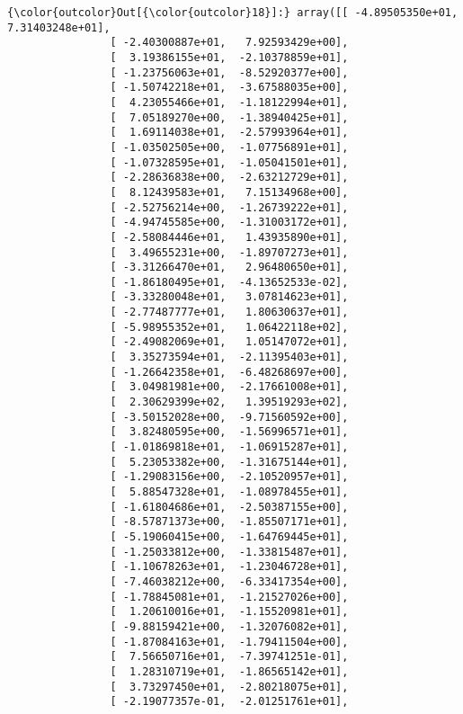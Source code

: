 \documentclass[11pt]{article}
\begin{document}
\begin{Verbatim}[commandchars=\\\{\}]
{\color{outcolor}Out[{\color{outcolor}18}]:} array([[ -4.89505350e+01,   7.31403248e+01],
                [ -2.40300887e+01,   7.92593429e+00],
                [  3.19386155e+01,  -2.10378859e+01],
                [ -1.23756063e+01,  -8.52920377e+00],
                [ -1.50742218e+01,  -3.67588035e+00],
                [  4.23055466e+01,  -1.18122994e+01],
                [  7.05189270e+00,  -1.38940425e+01],
                [  1.69114038e+01,  -2.57993964e+01],
                [ -1.03502505e+00,  -1.07756891e+01],
                [ -1.07328595e+01,  -1.05041501e+01],
                [ -2.28636838e+00,  -2.63212729e+01],
                [  8.12439583e+01,   7.15134968e+00],
                [ -2.52756214e+00,  -1.26739222e+01],
                [ -4.94745585e+00,  -1.31003172e+01],
                [ -2.58084446e+01,   1.43935890e+01],
                [  3.49655231e+00,  -1.89707273e+01],
                [ -3.31266470e+01,   2.96480650e+01],
                [ -1.86180495e+01,  -4.13652533e-02],
                [ -3.33280048e+01,   3.07814623e+01],
                [ -2.77487777e+01,   1.80630637e+01],
                [ -5.98955352e+01,   1.06422118e+02],
                [ -2.49082069e+01,   1.05147072e+01],
                [  3.35273594e+01,  -2.11395403e+01],
                [ -1.26642358e+01,  -6.48268697e+00],
                [  3.04981981e+00,  -2.17661008e+01],
                [  2.30629399e+02,   1.39519293e+02],
                [ -3.50152028e+00,  -9.71560592e+00],
                [  3.82480595e+00,  -1.56996571e+01],
                [ -1.01869818e+01,  -1.06915287e+01],
                [  5.23053382e+00,  -1.31675144e+01],
                [ -1.29083156e+00,  -2.10520957e+01],
                [  5.88547328e+01,  -1.08978455e+01],
                [ -1.61804686e+01,  -2.50387155e+00],
                [ -8.57871373e+00,  -1.85507171e+01],
                [ -5.19060415e+00,  -1.64769445e+01],
                [ -1.25033812e+00,  -1.33815487e+01],
                [ -1.10678263e+01,  -1.23046728e+01],
                [ -7.46038212e+00,  -6.33417354e+00],
                [ -1.78845081e+01,  -1.21527026e+00],
                [  1.20610016e+01,  -1.15520981e+01],
                [ -9.88159421e+00,  -1.32076082e+01],
                [ -1.87084163e+01,  -1.79411504e+00],
                [  7.56650716e+01,  -7.39741251e-01],
                [  1.28310719e+01,  -1.86565142e+01],
                [  3.73297450e+01,  -2.80218075e+01],
                [ -2.19077357e-01,  -2.01251761e+01],

\end{Verbatim}
\end{document}
